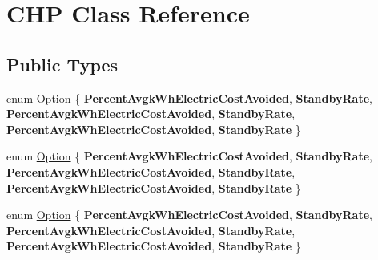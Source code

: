 \hypertarget{class_c_h_p}{}\section{C\+HP Class Reference}
\label{class_c_h_p}
\subsection*{Public Types}
\begin{DoxyCompactItemize}
\item 
enum \hyperlink{class_c_h_p_ac82f530412021ace928a7e95c1295d06}{Option} \{ \newline
{\bfseries Percent\+Avgk\+Wh\+Electric\+Cost\+Avoided}, 
{\bfseries Standby\+Rate}, 
{\bfseries Percent\+Avgk\+Wh\+Electric\+Cost\+Avoided}, 
{\bfseries Standby\+Rate}, 
\newline
{\bfseries Percent\+Avgk\+Wh\+Electric\+Cost\+Avoided}, 
{\bfseries Standby\+Rate}
 \}
\item 
enum \hyperlink{class_c_h_p_ac82f530412021ace928a7e95c1295d06}{Option} \{ \newline
{\bfseries Percent\+Avgk\+Wh\+Electric\+Cost\+Avoided}, 
{\bfseries Standby\+Rate}, 
{\bfseries Percent\+Avgk\+Wh\+Electric\+Cost\+Avoided}, 
{\bfseries Standby\+Rate}, 
\newline
{\bfseries Percent\+Avgk\+Wh\+Electric\+Cost\+Avoided}, 
{\bfseries Standby\+Rate}
 \}
\item 
enum \hyperlink{class_c_h_p_ac82f530412021ace928a7e95c1295d06}{Option} \{ \newline
{\bfseries Percent\+Avgk\+Wh\+Electric\+Cost\+Avoided}, 
{\bfseries Standby\+Rate}, 
{\bfseries Percent\+Avgk\+Wh\+Electric\+Cost\+Avoided}, 
{\bfseries Standby\+Rate}, 
\newline
{\bfseries Percent\+Avgk\+Wh\+Electric\+Cost\+Avoided}, 
{\bfseries Standby\+Rate}
 \}
\end{DoxyCompactItemize}
